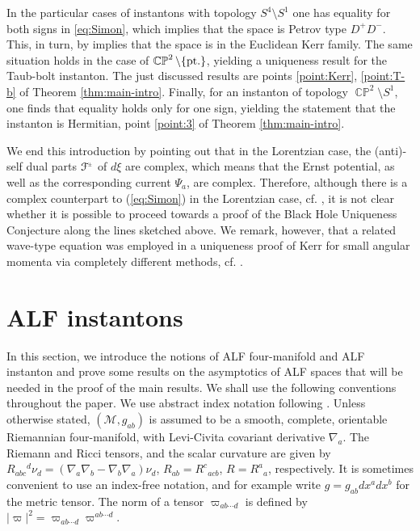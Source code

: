 \documentclass[a4paper,10pt,reqno]{amsart}
\newcommand{\cM}{\mathcal{M}}
\theoremstyle{plain}
\DeclareMathOperator{\CP}{\mathbb{C}\mathbb{P}}
\newcommand{\GenVec}{\nu}
\newcommand{\PM}[1]{{{#1}^{\hspace{-.5pt}\scaleto{\pm}{3.5pt}}}}
\def\Fcal{\mathcal{F}}
\numberwithin{equation}{section}
\begin{document}
In the particular cases of instantons with topology $S^4\setminus S^1$ one has equality for both signs in \eqref{eq:Simon}, which implies that the space is Petrov type $D^+D^-$. 
This, in turn, by \cite{Biquard:Gauduchon}  implies that the space is in the Euclidean Kerr family. The same situation holds in the case of $\CP^2 \setminus \{\text{\rm pt.}\}$, yielding a uniqueness result for the Taub-bolt instanton. The just discussed results are points \ref{point:Kerr}, \ref{point:T-b} of Theorem \ref{thm:main-intro}. Finally, for an instanton of topology $\CP^2 \setminus S^1$, one finds that equality holds only for one sign, yielding the statement that the instanton is Hermitian, point \ref{point:3} of Theorem \ref{thm:main-intro}.  

We end this introduction by pointing out that in the Lorentzian case, the (anti)-self dual parts $\PM{\Fcal}$ of $d\xi$ are complex, which means that the Ernst potential, as well as the corresponding current $\Psi_a$, are complex. Therefore, although there is a 
complex counterpart  to (\ref{eq:Simon})  in the Lorentzian case, cf. \cite{MR747036}, it is not clear whether it is possible to proceed towards a proof of the Black Hole Uniqueness Conjecture along the lines sketched above. We remark, however, that
a related wave-type equation was employed in a uniqueness proof of Kerr for small angular momenta via completely different methods, cf. \cite{MR2672799,MR2461426}. 


\section{ALF instantons} \label{sec:ALF-4mfd}
In this section, we introduce the notions of ALF four-manifold and ALF instanton and prove some results on the asymptotics of ALF spaces that will be needed in the proof of the main results. We shall use the following conventions throughout the paper. We use abstract index notation following \cite{PR:I}. 
Unless otherwise stated, $(\cM, g_{ab})$ is assumed to be a smooth,  complete, orientable Riemannian four-manifold, with Levi-Civita covariant derivative $\nabla_a$. The Riemann and Ricci tensors, and the scalar curvature are given by 
$R_{abc}{}^d \GenVec_d = (\nabla_a \nabla_b - \nabla_b \nabla_a) \GenVec_d$, $R_{ab} = R^c{}_{acb}$, $R =R^a{}_a$, respectively. It is sometimes convenient to use an index-free notation, and for example write $g = g_{ab} dx^a dx^b$ for the metric tensor. The norm of a tensor $\varpi_{ab \cdots d}$ is defined by $|\varpi|^2 = \varpi_{ab \cdots d} \varpi^{ab \cdots d}$.  
\end{document}
